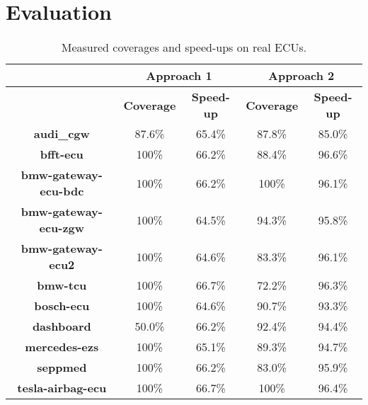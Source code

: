 \section{Evaluation}

\begin{table}[h]
    \begin{center}
    \begin{tabular}{|c||c|c||c|c|}
        \hline
        & \multicolumn{2}{c||}{\textbf{Approach 1}}& \multicolumn{2}{c|}{\textbf{Approach 2}} \\
        \hline
        & \textbf{Coverage} & \textbf{Speed-up} & \textbf{Coverage} & \textbf{Speed-up} \\
        \hline
        \textbf{audi\_cgw} & 87.6\% & 65.4\% & 87.8\% & 85.0\% \\
        \hline
        \textbf{bfft-ecu} & 100\% & 66.2\% & 88.4\% & 96.6\% \\
        \hline
        \textbf{bmw-gateway-ecu-bdc} & 100\% & 66.2\% & 100\% & 96.1\% \\
        \hline
        \textbf{bmw-gateway-ecu-zgw} & 100\% & 64.5\% & 94.3\% & 95.8\% \\
        \hline
        \textbf{bmw-gateway-ecu2} & 100\% & 64.6\% & 83.3\% & 96.1\% \\
        \hline
        \textbf{bmw-tcu} & 100\% & 66.7\% & 72.2\% & 96.3\% \\
        \hline
        \textbf{bosch-ecu} & 100\% & 64.6\% & 90.7\% & 93.3\% \\
        \hline
        \textbf{dashboard} & 50.0\% & 66.2\% & 92.4\% & 94.4\% \\
        \hline
        \textbf{mercedes-ezs} & 100\% & 65.1\% & 89.3\% & 94.7\% \\
        \hline
        \textbf{seppmed} & 100\% & 66.2\% & 83.0\% & 95.9\% \\
        \hline
        \textbf{tesla-airbag-ecu} & 100\% & 66.7\% & 100\% & 96.4\% \\
        \hline

    \end{tabular}
    \end{center}
    \caption{Measured coverages and speed-ups on real ECUs.}
    \label{tab:multicol}
\end{table}

